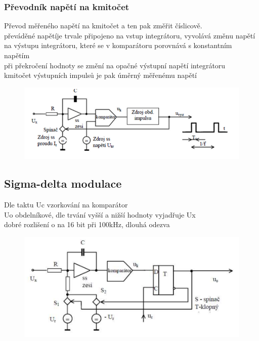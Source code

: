 \subsubsection*{Převodník napětí na kmitočet}
Převod měřeného napětí na kmitočet a ten pak změřit číslicově.\\
převáděné napětíje trvale připojeno na vstup integrátoru, vyvolává změnu napětí na výstupu integrátoru, které se v komparátoru porovnává s konstantním napětím\\
při překročení hodnoty se změní na opačné výstupní napětí integrátoru\\
kmitočet výstupních impulsů je pak úměrný měřenému napětí
\begin{figure}[H]
    \includegraphics*[scale = 1]{images/adc_V_na_f.png}
\end{figure}
 
\subsection*{Sigma-delta modulace}
Dle taktu Uc vzorkování na komparátor\\
Uo obdelníkové, dle trvání vyšší a nižší hodnoty vyjadřuje Ux\\
dobré rozlišení o na 16 bit při 100kHz, dlouhá odezva
\begin{figure}[H]
    \includegraphics*[scale = 1]{images/adc_sigma_delta_schema.png}
\end{figure}

